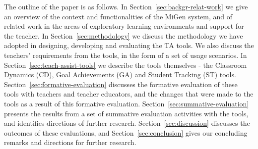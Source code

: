 The outline of the paper is as follows. In
Section~\ref{sec:backgr-relat-work}  we give an
overview of the context and functionalities of the MiGen system, and
of related work in the areas of exploratory learning environments and
support for the teacher. In Section~\ref{sec:methodology}
we discuss the methodology we
have adopted in designing, developing and evaluating the TA tools. We
also discuss the teachers’ requirements from the tools, in the form of
a set of usage scenarios. In Section~\ref{sec:teach-assist-tools}
we describe the tools
themselves - the Classroom Dynamics (CD), Goal Achievements (GA) and
Student Tracking (ST) tools. Section~\ref{sec:formative-evaluation} 
discusses the formative
evaluation of these tools with teachers and teacher educators, and the
changes that were made to the tools as a result of this formative
evaluation. Section~\ref{sec:summative-evaluation} 
presents the results from a set of summative
evaluation activities with the tools, and identifies directions of
further research.  Section~\ref{sec:discussion} 
discusses the outcomes of these
evaluations, and Section~\ref{sec:conclusion} 
gives our concluding remarks and directions
for further research.




